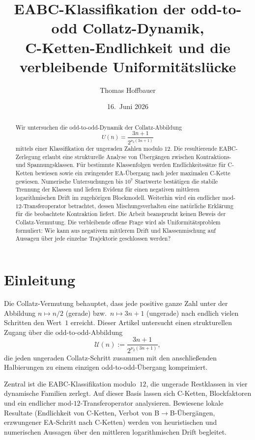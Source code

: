 \documentclass[12pt,a4paper]{article}
\title{%
  EABC-Klassifikation der odd-to-odd Collatz-Dynamik,\\
  C-Ketten-Endlichkeit und die verbleibende Uniformitätslücke
}
\author{Thomas Hoffbauer}
\date{16.\ Juni 2026}
\newcommand{\vii}{\nu_2}
\newcommand{\U}{\mathcal{U}}
\begin{document}
\maketitle

\begin{abstract}
Wir untersuchen die odd-to-odd-Dynamik der Collatz-Abbildung
\[
U(n)=\frac{3n+1}{2^{\nu_2(3n+1)}}
\]
mittels einer Klassifikation der ungeraden Zahlen modulo $12$.
Die resultierende EABC-Zerlegung erlaubt eine strukturelle Analyse
von Übergängen zwischen Kontraktions- und Spannungsklassen.
Für bestimmte Klassenfolgen werden Endlichkeitssätze für
C-Ketten bewiesen sowie ein zwingender EA-Übergang nach jeder
maximalen C-Kette gewiesen.
Numerische Untersuchungen bis $10^7$ Startwerte bestätigen die
stabile Trennung der Klassen und liefern Evidenz für einen
negativen mittleren logarithmischen Drift im zugehörigen
Blockmodell.
Weiterhin wird ein endlicher mod-$12$-Transferoperator betrachtet,
dessen Mischungsverhalten eine natürliche Erklärung für die
beobachtete Kontraktion liefert.
Die Arbeit beansprucht keinen Beweis der Collatz-Vermutung.
Die verbleibende offene Frage wird als Uniformitätsproblem
formuliert: Wie kann aus negativem mittlerem Drift und
Klassenmischung auf Aussagen über jede einzelne Trajektorie
geschlossen werden?
\end{abstract}

\tableofcontents
\newpage

\section{Einleitung}
\label{sec:einleitung}

Die Collatz-Vermutung behauptet, dass jede positive ganze Zahl unter der
Abbildung $n \mapsto n/2$ (gerade) bzw.\ $n \mapsto 3n+1$ (ungerade) nach
endlich vielen Schritten den Wert~$1$ erreicht. Dieser Artikel untersucht
einen strukturellen Zugang über die odd-to-odd-Abbildung
\[
  \U(n) := \frac{3n+1}{2^{\vii(3n+1)}},
\]
die jeden ungeraden Collatz-Schritt zusammen mit den anschließenden
Halbierungen zu einem einzigen odd-to-odd-Übergang komprimiert.

Zentral ist die EABC-Klassifikation modulo~$12$, die ungerade Restklassen
in vier dynamische Familien zerlegt. Auf dieser Basis lassen sich
C-Ketten, Blockfaktoren und ein endlicher mod-$12$-Transferoperator
analysieren. Bewiesene lokale Resultate (Endlichkeit von C-Ketten,
Verbot von B$\to$B-Übergängen, erzwungener EA-Schritt nach C-Ketten)
werden von heuristischen und numerischen Aussagen über den mittleren
logarithmischen Drift begleitet.
\end{document}
